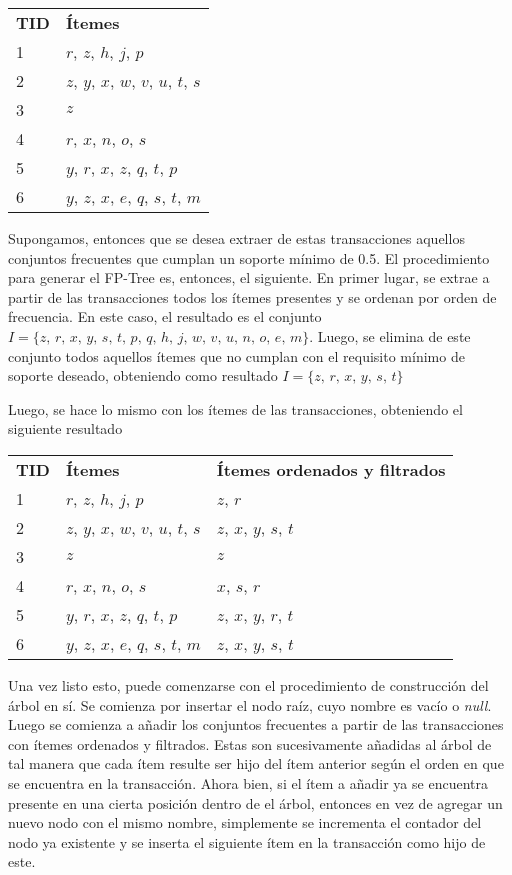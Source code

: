 \begin{tabular}{l l}
\textbf{TID} & \textbf{Ítemes} \\
1 & $r$, $z$, $h$, $j$, $p$ \\
2 & $z$, $y$, $x$, $w$, $v$, $u$, $t$, $s$ \\
3 & $z$ \\
4 & $r$, $x$, $n$, $o$, $s$ \\
5 & $y$, $r$, $x$, $z$, $q$, $t$, $p$ \\
6 & $y$, $z$, $x$, $e$, $q$, $s$, $t$, $m$ \\
\end{tabular}

Supongamos, entonces que se desea extraer de estas transacciones aquellos conjuntos frecuentes que cumplan un soporte mínimo de 0.5. El procedimiento para generar el FP-Tree es, entonces, el siguiente. En primer lugar, se extrae a partir de las transacciones todos los ítemes presentes y se ordenan por orden de frecuencia. En este caso, el resultado es el conjunto $I = \{z, \, r, \, x, \, y, \, s, \, t, \, p, \, q, \, h, \, j, \, w, \, v, \, u, \, n, \, o, \, e, \, m\}$. Luego, se elimina de este conjunto todos aquellos ítemes que no cumplan con el requisito mínimo de soporte deseado, obteniendo como resultado $I = \{z, \, r, \, x, \, y, \, s, \, t\}$

Luego, se hace lo mismo con los ítemes de las transacciones, obteniendo el siguiente resultado

\begin{tabular}{l l l}
\textbf{TID} & \textbf{Ítemes} & \textbf{Ítemes ordenados y filtrados} \\
1 & $r$, $z$, $h$, $j$, $p$ & $z$, $r$ \\
2 & $z$, $y$, $x$, $w$, $v$, $u$, $t$, $s$ & $z$, $x$, $y$, $s$, $t$ \\
3 & $z$ & $z$ \\
4 & $r$, $x$, $n$, $o$, $s$ & $x$, $s$, $r$ \\
5 & $y$, $r$, $x$, $z$, $q$, $t$, $p$ & $z$, $x$, $y$, $r$, $t$ \\
6 & $y$, $z$, $x$, $e$, $q$, $s$, $t$, $m$ & $z$, $x$, $y$, $s$, $t$ \\
\end{tabular}

Una vez listo esto, puede comenzarse con el procedimiento de construcción del árbol en sí. Se comienza por insertar el nodo raíz, cuyo nombre es vacío o \textit{null}. Luego se comienza a añadir los conjuntos frecuentes a partir de las transacciones con ítemes ordenados y filtrados. Estas son sucesivamente añadidas al árbol de tal manera que cada ítem resulte ser hijo del ítem anterior según el orden en que se encuentra en la transacción. Ahora bien, si el ítem a añadir ya se encuentra presente en una cierta posición dentro de el árbol, entonces en vez de agregar un nuevo nodo con el mismo nombre, simplemente se incrementa el contador del nodo ya existente y se inserta el siguiente ítem en la transacción como hijo de este.

